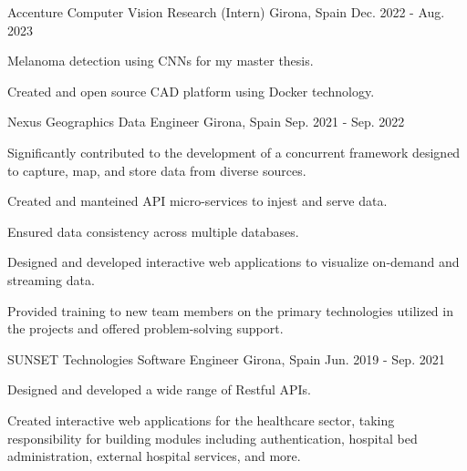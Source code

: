 \begin{cventries}
    \cventry
    {Accenture} %
    {Computer Vision Research (Intern)} %
    {Girona, Spain} %
    {Dec. 2022 - Aug. 2023} %
    {
    \begin{cvitems}
    \item{Melanoma detection using CNNs for my master thesis.}
    \item{Created and open source CAD platform using Docker technology.}
    \end{cvitems}
    }

      \cventry
      {Nexus Geographics} %
      {Data Engineer} %
      {Girona, Spain} %
      {Sep. 2021 - Sep. 2022} %
      {
        \begin{cvitems}
        \item {Significantly contributed to the development of a concurrent
          framework designed to capture, map, and store data from diverse
        sources.}
        \item {Created and manteined API micro-services to injest and serve data.}
        \item {Ensured data consistency across multiple databases.}
        \item {Designed and developed interactive web applications to visualize
          on-demand and streaming data.}
        \item {Provided training to new team members on the primary
          technologies utilized in the projects and offered problem-solving
        support.}
        \end{cvitems}
      }


      \cventry
      {SUNSET Technologies} %
      {Software Engineer} %
      {Girona, Spain} %
      {Jun. 2019 - Sep. 2021} %
      {
        \begin{cvitems}
        \item {Designed and developed a wide range of Restful APIs.}
        \item {Created interactive web applications for the healthcare sector,
          taking responsibility for building modules including authentication,
        hospital bed administration, external hospital services, and more.}
        \end{cvitems}
      }

  \end{cventries}
